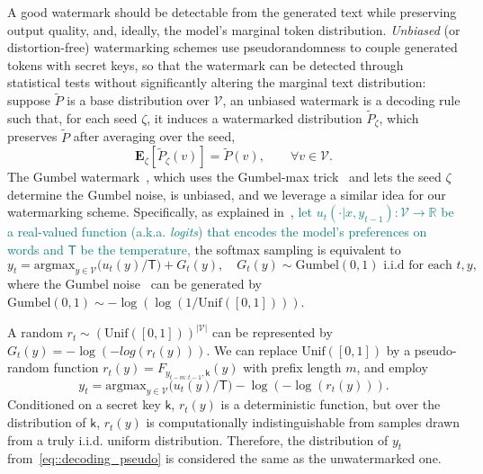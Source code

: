 \documentclass{article}
\theoremstyle{plain}
\theoremstyle{definition}
\begin{document}
A good watermark should be detectable from the generated text while preserving output quality, and, ideally, the model's marginal token distribution. 
\textit{Unbiased} (or distortion-free) watermarking schemes use pseudorandomness to couple generated tokens with secret keys, so that the watermark can be detected through statistical tests without significantly altering the marginal text distribution: 
suppose $\tilde{P}$ is a base distribution over $\mathcal{V}$, an unbiased watermark is a decoding rule such that, for each seed $\zeta$, it induces a watermarked distribution $\tilde{P}_\zeta$, which preserves $\tilde{P}$ after averaging over the seed, 
\[
\mathbf{E}_{\zeta} [\tilde{P}_\zeta(v)] = \tilde{P}(v), \qquad \forall v\in\mathcal{V}.
\]
The Gumbel watermark~\citep{aaronson2023watermarking}, which uses the Gumbel-max trick~\citep{gumbel1954statistical} and lets the seed $\zeta$ determine the Gumbel noise, is unbiased, and we leverage a similar idea for %
our watermarking scheme. 
Specifically, as explained in~\citep{zhao2024permute}, \textcolor{teal}{let $u_t(\cdot | x, y_{t-1}): \mathcal{V}\to \mathbb{R}$ be a real-valued function (a.k.a. \emph{logits}) that encodes the model's preferences on words and $\mathsf{T}$ be the temperature,} the softmax sampling is equivalent to
\[
y_t =  \mathrm{argmax}_{y\in\mathcal{V}}  \big({u_t(y)} \big/ \mathsf{T} \big) + G_t(y),\quad G_t(y)\sim\textrm{Gumbel}(0,1) \text{ i.i.d for each } t,y,
\]
where  the Gumbel noise~\citep{gumbel1954statistical} can be generated by $\textrm{Gumbel}(0,1) \sim -\log(\log(1/\textrm{Unif}([0,1])))$. 



A random $r_t\sim  (\textrm{Unif}([0,1]))^{|\mathcal{V}|}$ can be represented by $G_t(y) = - \log (-  log (r_t(y)))$. 
We can replace $\textrm{Unif}([0,1])$ by a pseudo-random function $r_t(y) = F_{y_{t-m:t-1},\mathsf{k}}(y)$ with prefix length $m$, and employ
\begin{equation}
    y_t =  \mathrm{argmax}_{y\in\mathcal{V}}  \big({u_t(y)} \big/ \mathsf{T} \big) -\log(-\log(r_t(y))). \label{eq::decoding_pseudo}
\end{equation}
Conditioned on a secret key $\mathsf{k}$, $r_t(y)$ is a deterministic function, but over the distribution of $\mathsf{k}$, $r_t(y)$ is computationally indistinguishable from %
samples drawn from a truly i.i.d. uniform distribution. Therefore, %
the distribution of $y_t$ from~\eqref{eq::decoding_pseudo} is considered the same as the unwatermarked one. 
\end{document}
